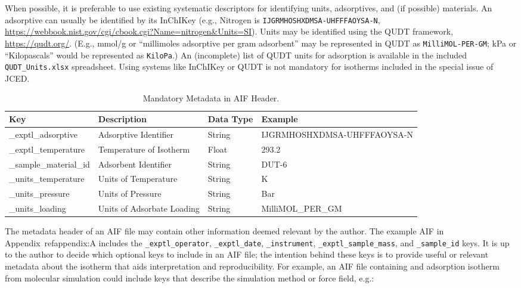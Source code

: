 \documentclass[preprint,pre,showkeys,12pt,superscriptaddress,nofootinbib,endfloats*]{revtex4-1}
\begin{document}
When possible, it is preferable to use existing systematic descriptors for identifying units, adsorptives, and (if possible) materials. An adsorptive can usually be identified by its InChIKey (e.g., Nitrogen is \verb!IJGRMHOSHXDMSA-UHFFFAOYSA-N!, \url{https://webbook.nist.gov/cgi/cbook.cgi?Name=nitrogen&Units=SI}). Units may be identified using the QUDT framework, \url{https://qudt.org/}. (E.g., mmol/g or ``millimoles adsorptive per gram adsorbent'' may be represented in QUDT as \verb!MilliMOL-PER-GM!; kPa or ``Kilopascals'' would be represented as \verb!KiloPa!.) An (incomplete) list of QUDT units for adsorption is available in the included \verb!QUDT_Units.xlsx! spreadsheet. Using systems like InChIKey or QUDT is not mandatory for isotherms included in the special issue of JCED.

\begin{table}%
  \begin{center}
    \label{tab:meta_req}
    \begin{tabular}{l|l|l|l}
      \textbf{Key} & \textbf{Description} & \textbf{Data Type} & \textbf{Example}\\
      \hline
      \_exptl\_adsorptive & Adsorptive Identifier & String & IJGRMHOSHXDMSA-UHFFFAOYSA-N \\
      \_exptl\_temperature & Temperature of Isotherm & Float & 293.2 \\
      \_sample\_material\_id & Adsorbent Identifier & String & DUT-6 \\
      \_units\_temperature & Units of Temperature & String & K \\
      \_units\_pressure & Units of Pressure & String & Bar \\
      \_units\_loading & Units of Adsorbate Loading & String & MilliMOL\_PER\_GM \\
    \end{tabular}
    \caption{Mandatory Metadata in AIF Header.}
  \end{center}
\end{table}

The metadata header of an AIF file may contain other information deemed relevant by the author. The example AIF in Appendix~ref{appendix:A} includes the \verb!_exptl_operator!, \verb!_exptl_date!, \verb!_instrument!, \verb!_exptl_sample_mass!, and \verb!_sample_id! keys. It is up to the author to decide which optional keys to include in an AIF file; the intention behind these keys is to provide useful or relevant metadata about the isotherm that aids interpretation and reproducibility. For example, an AIF file containing and adsorption isotherm from molecular simulation could include keys that describe the simulation method or force field, e.g.:\newline
\end{document}
